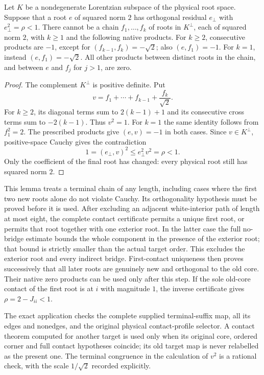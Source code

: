 \begin{lemma}
\label{lem:terminal-b-tail}
Let $K$ be a nondegenerate Lorentzian subspace of the physical root space.
Suppose that a root $e$ of squared norm $2$ has orthogonal residual
$e_\perp$ with $e_\perp^2=\rho<1$. There cannot be a chain
$f_1,\ldots,f_k$ of roots in $K^\perp$, each of squared norm $2$,
with $k\ge1$ and the following native products. For $k\ge2$, consecutive products
are $-1$, except for $(f_{k-1},f_k)=-\sqrt2$; also
$(e,f_1)=-1$. For $k=1$, instead $(e,f_1)=-\sqrt2$.
All other products between distinct roots in the chain, and between
$e$ and $f_j$ for $j>1$, are zero.
\end{lemma}

\begin{proof}
The complement $K^\perp$ is positive definite. Put
\[
 v=f_1+\cdots+f_{k-1}+\frac{f_k}{\sqrt2}.
\]
For $k\ge2$, its diagonal terms sum to $2(k-1)+1$ and its
consecutive cross terms sum to $-2(k-1)$. Thus $v^2=1$.
For $k=1$ the same identity follows from $f_1^2=2$.
The prescribed products give $(e,v)=-1$ in both cases.
Since $v\in K^\perp$, positive-space Cauchy gives the contradiction
\[
 1=(e_\perp,v)^2\le e_\perp^2v^2=\rho<1.
\]
Only the coefficient of the final root has changed: every physical
root still has squared norm $2$.
\end{proof}

This lemma treats a terminal chain of any length, including cases where
the first two new roots alone do not violate Cauchy. Its orthogonality
hypothesis must be proved before it is used. After excluding an adjacent
white-interior path of length at most eight, the complete contact
certificate permits a unique first root, or permits
that root together with one exterior root. In the latter case the
full no-bridge estimate bounds the whole component in the presence of
the exterior root; that bound is strictly smaller than the actual target
order. This excludes the exterior root and every indirect bridge.
First-contact uniqueness then proves successively that all later roots
are genuinely new and orthogonal to the old core. Their native zero
products can be used only after this step. If the sole old-core contact of the first root
is at $i$ with magnitude $1$, the inverse certificate gives
$\rho=2-J_{ii}<1$.

The exact application checks the complete supplied terminal-suffix map,
all its edges and nonedges, and the original physical contact-profile
selector. A contact theorem computed for another target is used only
when its original core, ordered corner and full contact hypotheses
coincide; its old target map is never relabelled as the present one.
The terminal congruence in the calculation of $v^2$ is a rational check,
with the scale $1/\sqrt2$ recorded explicitly.


